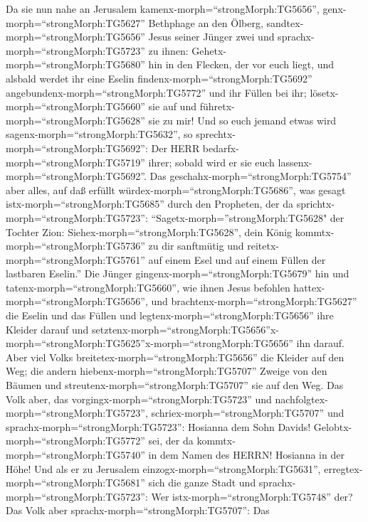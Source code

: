  Da sie nun nahe an Jerusalem
kamenx-morph=``strongMorph:TG5656'', genx-morph=``strongMorph:TG5627''
Bethphage an den Ölberg, sandtex-morph=``strongMorph:TG5656'' Jesus
seiner Jünger zwei  und sprachx-morph=``strongMorph:TG5723''
zu ihnen: Gehetx-morph=``strongMorph:TG5680'' hin in den Flecken, der
vor euch liegt, und alsbald werdet ihr eine Eselin
findenx-morph=``strongMorph:TG5692''
angebundenx-morph=``strongMorph:TG5772'' und ihr Füllen bei ihr;
lösetx-morph=``strongMorph:TG5660'' sie auf und
führetx-morph=``strongMorph:TG5628'' sie zu mir!  Und so
euch jemand etwas wird sagenx-morph=``strongMorph:TG5632'', so
sprechtx-morph=``strongMorph:TG5692'': Der HERR
bedarfx-morph=``strongMorph:TG5719'' ihrer; sobald wird er sie euch
lassenx-morph=``strongMorph:TG5692''.  Das
geschahx-morph=``strongMorph:TG5754'' aber alles, auf daß erfüllt
würdex-morph=``strongMorph:TG5686'', was gesagt
istx-morph=``strongMorph:TG5685'' durch den Propheten, der da
sprichtx-morph=``strongMorph:TG5723'': 
``Sagetx-morph=''strongMorph:TG5628" der Tochter Zion:
Siehex-morph=``strongMorph:TG5628'', dein König
kommtx-morph=``strongMorph:TG5736'' zu dir sanftmütig und
reitetx-morph=``strongMorph:TG5761'' auf einem Esel und auf einem Füllen
der lastbaren Eselin.''  Die Jünger
gingenx-morph=``strongMorph:TG5679'' hin und
tatenx-morph=``strongMorph:TG5660'', wie ihnen Jesus befohlen
hattex-morph=``strongMorph:TG5656'',  und
brachtenx-morph=``strongMorph:TG5627'' die Eselin und das Füllen und
legtenx-morph=``strongMorph:TG5656'' ihre Kleider darauf und
setztenx-morph=``strongMorph:TG5656''\textbar x-morph=``strongMorph:TG5625''x-morph=``strongMorph:TG5656''
ihn darauf.  Aber viel Volks
breitetex-morph=``strongMorph:TG5656'' die Kleider auf den Weg; die
andern hiebenx-morph=``strongMorph:TG5707'' Zweige von den Bäumen und
streutenx-morph=``strongMorph:TG5707'' sie auf den Weg.  Das
Volk aber, das vorgingx-morph=``strongMorph:TG5723'' und
nachfolgtex-morph=``strongMorph:TG5723'',
schriex-morph=``strongMorph:TG5707'' und
sprachx-morph=``strongMorph:TG5723'': Hosianna dem Sohn Davids!
Gelobtx-morph=``strongMorph:TG5772'' sei, der da
kommtx-morph=``strongMorph:TG5740'' in dem Namen des HERRN! Hosianna in
der Höhe!  Und als er zu Jerusalem
einzogx-morph=``strongMorph:TG5631'',
erregtex-morph=``strongMorph:TG5681'' sich die ganze Stadt und
sprachx-morph=``strongMorph:TG5723'': Wer
istx-morph=``strongMorph:TG5748'' der?  Das Volk aber
sprachx-morph=``strongMorph:TG5707'': Das
